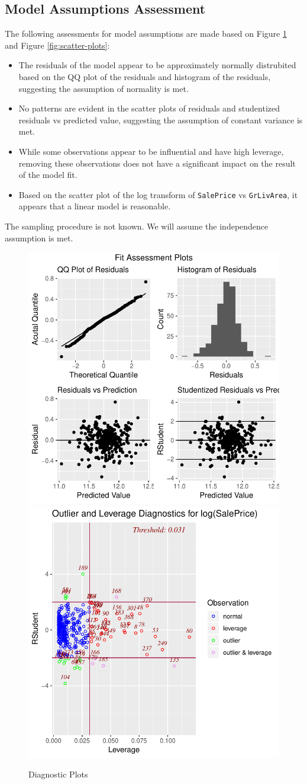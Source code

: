 \documentclass[american,]{article}
\providecommand{\tightlist}{%
  \setlength{\itemsep}{0pt}\setlength{\parskip}{0pt}}
\begin{document}
\hypertarget{model-assumptions-assessment}{%
\subsection{Model Assumptions
Assessment}\label{model-assumptions-assessment}}

The following assessments for model assumptions are made based on Figure
\ref{fig:diag-plots} and Figure \ref{fig:scatter-plots}:

\begin{itemize}
\tightlist
\item
  The residuals of the model appear to be approximately normally
  distrubited based on the QQ plot of the residuals and histogram of the
  residuals, suggesting the assumption of normality is met.
\item
  No patterns are evident in the scatter plots of residuals and
  studentized residuals vs predicted value, suggesting the assumption of
  constant variance is met.
\item
  While some observations appear to be influential and have high
  leverage, removing these observations does not have a significant
  impact on the result of the model fit.
\item
  Based on the scatter plot of the log transform of \texttt{SalePrice}
  vs \texttt{GrLivArea}, it appears that a linear model is reasonable.
\end{itemize}

The sampling procedure is not known. We will assume the independence
assumption is met.

\begin{figure}[htbp]

{\centering \includegraphics[width=0.45\linewidth]{HousePriceRegressionAnalysis_files/figure-latex/diag-plots-1} \includegraphics[width=0.45\linewidth]{HousePriceRegressionAnalysis_files/figure-latex/diag-plots-2} 

}

\caption{Diagnostic Plots}\label{fig:diag-plots}
\end{figure}
\end{document}
